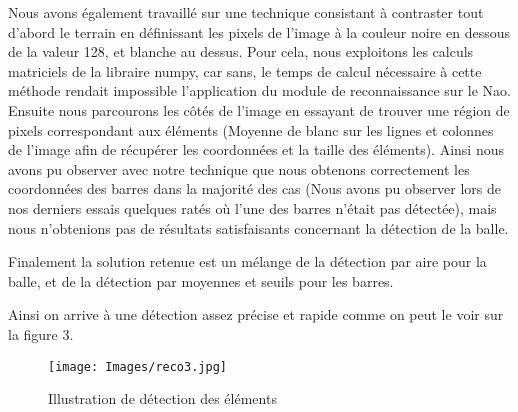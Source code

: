 \par Nous avons également travaillé sur une
technique consistant à contraster tout
d'abord le terrain en définissant les pixels de l'image à la couleur noire en
dessous de la valeur 128, et blanche au dessus. Pour cela, nous exploitons les calculs matriciels de la libraire numpy, car sans, le temps de calcul nécessaire à cette méthode rendait impossible l’application du module de reconnaissance sur le Nao. Ensuite nous parcourons les
côtés de l'image en essayant de trouver une région de pixels correspondant aux
éléments (Moyenne de blanc sur les lignes et colonnes de l'image afin de récupérer les
coordonnées et la taille des éléments). Ainsi nous avons pu observer avec notre
technique que nous obtenons correctement les coordonnées des barres dans la
majorité des cas (Nous avons pu observer lors de nos derniers essais quelques
ratés où l'une des barres n'était pas détectée), mais nous n'obtenions pas de
résultats satisfaisants concernant la détection de la balle.

\par Finalement la solution retenue est un mélange de la détection par aire pour
la balle, et de la détection par moyennes et seuils pour les barres.
\par Ainsi on arrive à une détection assez précise et rapide comme on peut le voir sur la figure 3.

\begin{figure}[h]
  \caption{Illustration de détection des éléments}
  \label{fig:illustration du problème IA}
  \centering
  \texttt{[image: Images/reco3.jpg]}
\end{figure}
